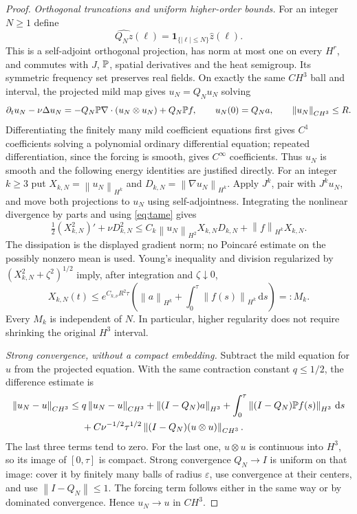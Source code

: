 \documentclass[11pt,a4paper]{article}
\theoremstyle{definition}\newtheorem{definition}[theorem]{Definition}
\theoremstyle{remark}\newtheorem{remark}[theorem]{Remark}
\newcommand{\dd}{\,\mathrm d}\newcommand{\eps}{\varepsilon}
\newcommand{\norm}[1]{\left\lVert#1\right\rVert}
\begin{document}
\begin{proof}
\emph{Orthogonal truncations and uniform higher-order bounds.}
For an integer $N\ge1$ define
\[
 \widehat{Q_N z}(\ell)=\mathbf1_{\{|\ell|\le N\}}\widehat z(\ell).
\]
This is a self-adjoint orthogonal projection, has norm at most one on every
$H^r$, and commutes with $J$, $\mathbb P$, spatial derivatives and the heat
semigroup. Its symmetric frequency set preserves real fields.
On exactly the same $C H^3$ ball and interval, the projected mild map gives
$u_N=Q_Nu_N$ solving
\[
 \partial_tu_N-\nu\Delta u_N
 =-Q_N\PP\nabla\cdot(u_N\otimes u_N)+Q_N\PP f,
 \qquad u_N(0)=Q_Na,
 \qquad\norm{u_N}_{C H^3}\le R.
\]
Differentiating the finitely many mild coefficient equations first gives
$C^1$ coefficients solving a polynomial ordinary differential equation;
repeated differentiation, since the forcing is smooth, gives $C^\infty$ coefficients. Thus $u_N$ is smooth and the following energy
identities are justified directly. For an integer $k\ge3$
put $X_{k,N}=\norm{u_N}_{H^k}$ and
$D_{k,N}=\norm{\nabla u_N}_{H^k}$. Apply $J^k$, pair with $J^ku_N$, and
move both projections to $u_N$ using self-adjointness. Integrating the
nonlinear divergence by parts and using \eqref{eq:tame} gives
\[
 \tfrac12(X_{k,N}^2)'+\nu D_{k,N}^2
 \le C_k\norm{u_N}_{H^2}X_{k,N}D_{k,N}
       +\norm{f}_{H^k}X_{k,N}.
\]
The dissipation is the displayed gradient norm; no Poincar\'e estimate on the
possibly nonzero mean is used. Young's inequality and division regularized
by $(X_{k,N}^2+\zeta^2)^{1/2}$ imply, after integration and
$\zeta\downarrow0$,
\[
 X_{k,N}(t)\le
 e^{C_{k,\nu}R^2\tau}
 \left(\norm{a}_{H^k}+\int_0^\tau\norm{f(s)}_{H^k}\dd s\right)=:M_k.
\]
Every $M_k$ is independent of $N$. In particular, higher regularity does not
require shrinking the original $H^3$ interval.

\emph{Strong convergence, without a compact embedding.}
Subtract the mild equation for $u$ from the projected equation. With the
same contraction constant $q\le1/2$, the difference estimate is
\begin{align*}
 \norm{u_N-u}_{C H^3}\le{}&q\norm{u_N-u}_{C H^3}
  +\norm{(I-Q_N)a}_{H^3}
  +\int_0^\tau\norm{(I-Q_N)\PP f(s)}_{H^3}\dd s\\
 &+C\nu^{-1/2}\tau^{1/2}
       \norm{(I-Q_N)(u\otimes u)}_{C H^3}.
\end{align*}
The last three terms tend to zero. For the last one, $u\otimes u$ is
continuous into $H^3$, so its image of $[0,\tau]$ is compact. Strong
convergence $Q_N\to I$ is uniform on that image: cover it by finitely many
balls of radius $\varepsilon$, use convergence at their centers, and use
$\norm{I-Q_N}\le1$. The forcing term follows either in the same way or by
dominated convergence. Hence $u_N\to u$ in $C H^3$.


\end{proof}
\end{document}
